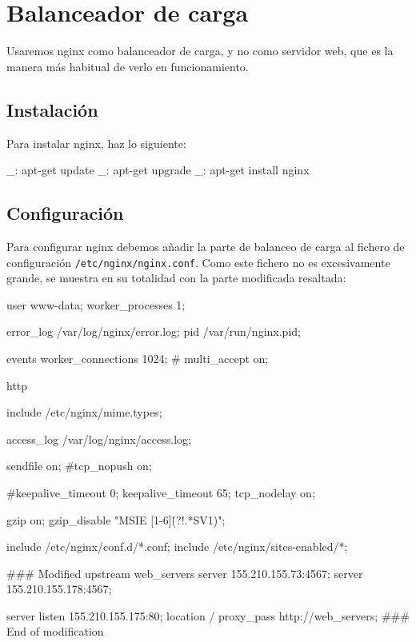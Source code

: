 \chapter{Balanceador de carga}
\label{web:balanceador}

Usaremos nginx como balanceador de carga, y no como servidor web, que es la manera más habitual de verlo en funcionamiento.


\section{Instalación}

Para instalar nginx, haz lo siguiente:

\begin{bashcode}
_: apt-get update
_: apt-get upgrade
_: apt-get install nginx
\end{bashcode}


\section{Configuración}

Para configurar nginx debemos añadir la parte de balanceo de carga al fichero de configuración \texttt{/etc/nginx/nginx.conf}. Como este fichero no es excesivamente grande, se muestra en su totalidad con la parte modificada resaltada:

\begin{bashcode}
user www-data;
worker_processes  1;

error_log  /var/log/nginx/error.log;
pid        /var/run/nginx.pid;

events {
    worker_connections  1024;
    # multi_accept on;
}

http {
    include       /etc/nginx/mime.types;

    access_log	/var/log/nginx/access.log;

    sendfile        on;
    #tcp_nopush     on;

    #keepalive_timeout  0;
    keepalive_timeout  65;
    tcp_nodelay        on;

    gzip  on;
    gzip_disable "MSIE [1-6]\.(?!.*SV1)";

    include /etc/nginx/conf.d/*.conf;
    include /etc/nginx/sites-enabled/*;


    ### Modified
    upstream web_servers {
      server 155.210.155.73:4567;
      server 155.210.155.178:4567;
    }

    server {
      listen 155.210.155.175:80;
      location / {
        proxy_pass http://web_servers;
      }
    }
    ### End of modification


}
\end{bashcode}


